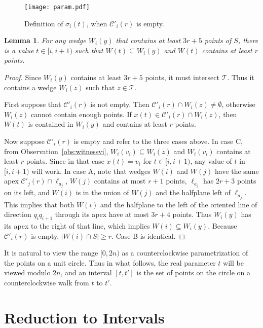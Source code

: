 \documentclass[english,11pt]{article}
\newtheorem{lemma}{Lemma}
\newcommand{\bigc}{\mathcal C}
\newcommand{\bigt}{\mathcal T}
\begin{document}
\begin{figure}[htb]
\begin{center}
\texttt{[image: param.pdf]}
\end{center}
\caption{\label{fig:param}Definition of $\sigma_{i}(t)$, when $\bigc'_i(r)$ is empty.}
\end{figure}

\begin{lemma}
\label{lem:witnesses}
For any wedge $W_i(y)$ that contains at least $3r{+}5$ points of $S$,
there is a value $t\in[i,i{+}1)$ such that $W(t)\subseteq W_i(y)$
and $W(t)$ contains at least $r$ points.
\end{lemma}
\begin{proof}
Since $W_i(y)$ contains at least $3r{+}5$ points, it must intersect $\bigt$. Thus it contains a wedge
$W_i(z)$ such that $z\in\bigt$. 

First suppose that $\bigc'_i(r)$ is not empty. Then $\bigc'_i (r)\cap W_i(z)\not= \emptyset$, otherwise
$W_i(z)$ cannot contain enough points. 
If $x(t)\in \bigc'_i (r)\cap W_i(z)$, then $W(t)$
is contained in $W_i(y)$ and contains at least $r$ points. 

Now suppose $\bigc'_i(r)$ is empty and refer to the three cases above. 
In case C, from Observation~\ref{obs:witnessvi}, $W_i(v_i) \subseteq W_i(z)$ and
$W_i(v_i)$ contains at least $r$ points. Since in that case $x(t) =
v_i$ for $t\in[i,i{+}1)$, any value of $t$ in $[i,i{+}1)$ will work. 
In case A, note that  wedges $W(i)$ and $W(j)$ have the same apex 
$\bigc'_j(r)\cap\ell_{a_j}$, $W(j)$ contains at most $r{+}1$ points,
$\ell_{a_j}$ has $2r{+}3$ points on its left, and $W(i)$ is in the
union of $W(j)$ and the halfplane left of $\ell_{a_j}$.
This implies that both $W(i)$ and the halfplane to the left of the oriented
line of direction $q_{i}q_{i{+}1}$ through its apex have at most $3r{+}4$
points. Thus $W_i(y)$ has its apex to the right
of that line, which implies $W(i)\subseteq W_i(y)$. 
Because $\bigc'_i(r)$ is empty, $|W(i)\cap S|\geq r$.
Case B is identical.
\end{proof}

It is natural to view the range $[0,2n)$ as a counterclockwise
parametrization of the points on a unit circle. Thus in what follows,
the real parameter $t$ will be viewed modulo $2n$, and an interval
$[t,t']$ is the set of points on the circle on a counterclockwise walk
from $t$ to $t'$. 

\section{Reduction to Intervals}
\label{sec:inter}
\end{document}
